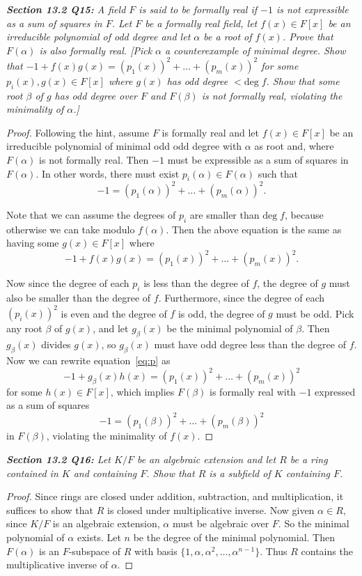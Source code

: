 \documentclass{article}
\begin{document}
\it \textbf{Section 13.2 Q15:} A field $F$ is said to be formally real if
  $-1$ is not expressible as a sum of squares in $F$. Let $F$ be a formally
  real field, let $f(x)\in F[x]$ be an irreducible polynomial of odd degree
  and let $\alpha$ be a root of $f(x)$. Prove that $F(\alpha)$ is also
  formally real. [Pick $\alpha$ a counterexample of minimal degree. Show
  that $-1+f(x)g(x) =(p_1(x))^2 +\ldots +(p_m(x))^2$ for some
  $p_i(x),g(x)\in F[x]$ where $g(x)$ has odd degree $<\text{deg}\; f$. Show
  that some root $\beta$ of $g$ has odd degree over $F$ and $F(\beta)$ is
  not formally real, violating the minimality of $\alpha$.] 

  \begin{proof}
    Following the hint, assume $F$ is formally real and let $f(x)\in F[x]$
    be an irreducible polynomial of minimal odd odd degree with $\alpha$ as
    root and, where $F(\alpha)$ is not formally real. Then $-1$ must be
    expressible as a sum of squares in $F(\alpha)$. In other words, there
    must exist $p_i(\alpha)\in F(\alpha)$ such that
    \[-1 =(p_1(\alpha))^2 +\ldots +(p_m(\alpha))^2.\]

    Note that we can assume the degrees of $p_i$ are smaller than
    $\text{deg}\; f$, because otherwise we can take modulo $f(\alpha)$.
    Then the above equation is the same as having some $g(x)\in F[x]$ where
    \begin{equation}
      -1+f(x)g(x) =(p_1(x))^2 +\ldots +(p_m(x))^2.
      \label{eq:p}
    \end{equation}

    Now since the degree of each $p_i$ is less than the degree of $f$, the
    degree of $g$ must also be smaller than the degree of $f$. Furthermore,
    since the degree of each $(p_i(x))^2$ is even and the degree of $f$ is
    odd, the degree of $g$ must be odd. Pick any root $\beta$ of $g(x)$,
    and let $g_\beta(x)$ be the minimal polynomial of $\beta$. Then
    $g_\beta(x)$ divides $g(x)$, so $g_\beta(x)$ must
    have odd degree less than the degree of $f$. Now we can rewrite
    equation~\ref{eq:p} as
    \[-1+g_\beta(x)h(x) =(p_1(x))^2 +\ldots +(p_m(x))^2\]
    for some $h(x)\in F[x]$, which implies $F(\beta)$ is formally real with
    $-1$ expressed as a sum of squares
    \[-1 =(p_1(\beta))^2 +\ldots +(p_m(\beta))^2\]
    in $F(\beta)$, violating the minimality of $f(x)$.
  \end{proof}

\it \textbf{Section 13.2 Q16:} Let $K/F$ be an algebraic extension and let
  $R$ be a ring contained in $K$ and containing $F$. Show that $R$ is a
  subfield of $K$ containing $F$.

  \begin{proof}
    Since rings are closed under addition, subtraction, and multiplication,
    it suffices to show that $R$ is closed under multiplicative inverse.
    Now given $\alpha\in R$, since $K/F$ is an algebraic extension,
    $\alpha$ must be algebraic over $F$. So the minimal polynomial
    of $\alpha$ exists. Let $n$ be the degree of the minimal polynomial.
    Then $F(\alpha)$ is an $F$-subspace of $R$ with basis
    $\{1,\alpha,\alpha^2,\ldots,\alpha^{n-1}\}$. Thus $R$ contains the
    multiplicative inverse of $\alpha$.
  \end{proof}
\end{document}
